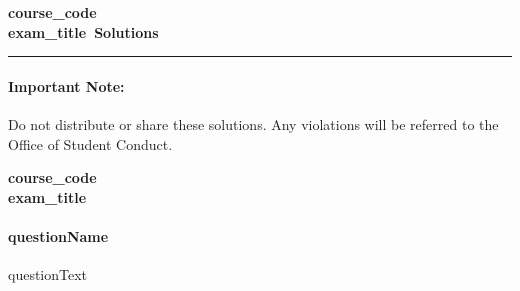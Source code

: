 \documentclass[11pt]{article}
\newif\ifsolutions
\newcommand{\coursecode}{{{course_code}}}
\newcommand{\examtitle}{{{exam_title}}}
\begin{document}
\thispagestyle{empty}
\ifsolutions
\begin{center}
\Large\bf\coursecode\\[2pt] \examtitle ~Solutions \\ \large\docdate
\end{center}

\hrule
\paragraph{Important Note:} Do not distribute or share these solutions. Any violations will be referred to the Office of Student Conduct.
\else 
\begin{center}
\Large\bf\coursecode\\[2pt] \examtitle \\
\end{center}

\paragraph{{{questionName}}}
{{questionText}}

\vspace{2cm} %
\end{document}
